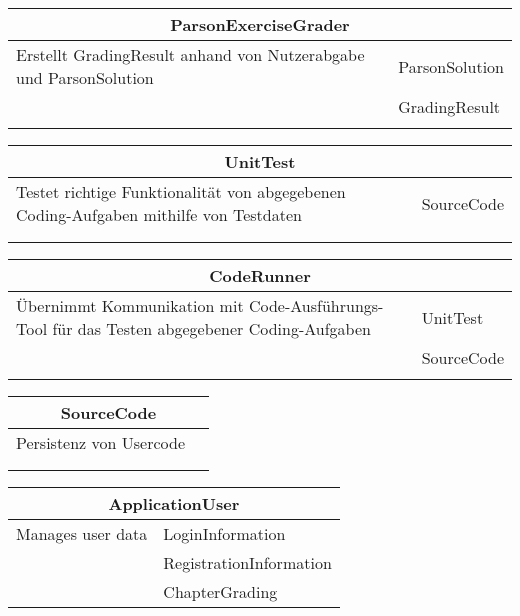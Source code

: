 \documentclass[11pt]{article}
\begin{document}
\begin{table}[h]
\begin{tabularx}{\textwidth}{|X|X|}
\hline
\multicolumn{2}{|c|}{ParsonExerciseGrader}\\ \hline
Erstellt GradingResult anhand von Nutzerabgabe und ParsonSolution &ParsonSolution   \\ \hline
&GradingResult \\ \hline
& \\ \hline
\end{tabularx}
\end{table}


\begin{table}[h]
\begin{tabularx}{\textwidth}{|X|X|}
\hline
\multicolumn{2}{|c|}{UnitTest}\\ \hline
Testet richtige Funktionalität von abgegebenen Coding-Aufgaben mithilfe von Testdaten&SourceCode\\  \hline
& \\ \hline
 & \\ \hline
\end{tabularx}
\end{table}

\begin{table}[h]
\begin{tabularx}{\textwidth}{|X|X|}
\hline
\multicolumn{2}{|c|}{CodeRunner}\\ \hline
Übernimmt Kommunikation mit Code-Ausführungs-Tool für das Testen abgegebener Coding-Aufgaben&UnitTest  \\  \hline
&SourceCode \\ \hline
 & \\ \hline
\end{tabularx}
\end{table}


\begin{table}[h]
\begin{tabularx}{\textwidth}{|X|X|}
\hline
\multicolumn{2}{|c|}{SourceCode}\\ \hline
Persistenz von Usercode& \\  \hline
& \\ \hline
    & \\ \hline
\end{tabularx}
\end{table}

\begin{table}[h]
\begin{tabularx}{\textwidth}{|X|X|}
\hline
\multicolumn{2}{|c|}{ApplicationUser}\\ \hline
Manages user data& LoginInformation  \\  \hline
&RegistrationInformation \\ \hline
 &ChapterGrading \\ \hline
\end{tabularx}
\end{table}
\end{document}
